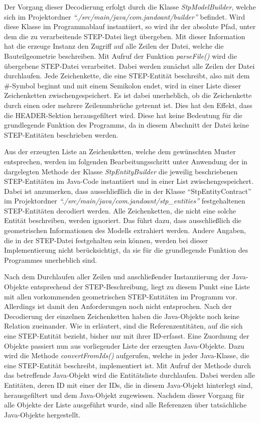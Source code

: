 Der Vorgang dieser Decodierung erfolgt durch die Klasse \textit{StpModelBuilder}, welche sich im Projektordner \textit{"`./src/main/java/com.jandoant/builder"'} befindet. 
Wird diese Klasse im Programmablauf instantiiert, so wird ihr der absolute Pfad, unter dem die zu verarbeitende STEP-Datei liegt übergeben. Mit dieser Information hat die erzeuge Instanz den Zugriff auf alle Zeilen der Datei, welche die Bauteilgeometrie beschreiben.
Mit Aufruf der Funktion \textit{parseFile()} wird die übergebene STEP-Datei verarbeitet. Dabei werden zunächst alle Zeilen der Datei durchlaufen. Jede Zeichenkette, die eine STEP-Entität beschreibt, also mit dem \#-Symbol beginnt und mit einem Semikolon endet, wird in einer Liste dieser Zeichenketten zwischengespeichert. Es ist dabei unerheblich, ob die Zeichenkette durch einen oder mehrere Zeilenumbrüche getrennt ist. Dies hat den Effekt, dass die HEADER-Sektion herausgefiltert wird. Diese hat keine Bedeutung für die grundlegende Funktion des Programms, da in diesem Abschnitt der Datei keine STEP-Entitäten beschrieben werden.

Aus der erzeugten Liste an Zeichenketten, welche dem gewünschten Muster entsprechen, werden im folgenden Bearbeitungsschritt unter Anwendung der in  dargelegten Methode  der Klasse  \textit{StpEntityBuilder} die jeweilig beschriebenen STEP-Entitäten im Java-Code instantiiert und in einer List zwischengespeichert. Dabei ist anzumerken, dass ausschließlich die in der Klasse "`StpEntityContract"' im Projektordner \textit{"`./src/main/java/com.jandoant/stp\_entities"'} festgehaltenen STEP-Entitäten decodiert werden. Alle Zeichenketten, die nicht eine solche Entität beschreiben, werden ignoriert. Das führt dazu, dass ausschließlich die geometrischen Informationen des Modells extrahiert werden. Andere Angaben, die in der STEP-Datei festgehalten sein können, werden bei dieser Implementierung nicht berücksichtigt, da sie für die grundlegende Funktion des Programmes unerheblich sind.

Nach dem Durchlaufen aller Zeilen und anschließender Instanziierung der Java-Objekte entsprechend der STEP-Beschreibung, liegt zu diesem Punkt eine Liste mit allen vorkommenden geometrischen STEP-Entitäten im Programm vor. Allerdings ist damit den Anforderungen noch nicht entsprochen. Nach der Decodierung der einzelnen Zeichenketten haben die Java-Objekte noch keine Relation zueinander. Wie in  erläutert, sind die Referenzentitäten, auf die sich eine STEP-Entität bezieht, bisher nur mit ihrer ID-erfasst. Eine Zuordnung der Objekte passiert nun aus vorliegender Liste der erzeugten Java-Objekte. 
Dazu wird die Methode \textit{convertFromIds()} aufgerufen, welche in jeder Java-Klasse, die eine STEP-Entität beschreibt, implementiert ist.
Mit Aufruf der Methode durch das betreffende Java-Objekt wird die Entitätsliste durchlaufen. Dabei werden alle Entitäten, deren ID mit einer der IDs, die in diesem Java-Objekt hinterlegt sind, herausgefiltert und dem Java-Objekt zugewiesen. Nachdem dieser Vorgang für alle Objekte der Liste ausgeführt wurde, sind alle Referenzen über tatsächliche Java-Objekte hergestellt. 

